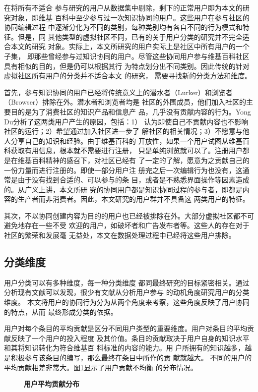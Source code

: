 在将所有不适合
参与研究的用户从数据集中剔除，剩下的正常用户即为本文的研究对象，即维基
百科中至少参与过一次知识协同的用户。这些用户在参与社区的协同编辑过程
中逐渐分化为不同的类别，每种类别均有各自不同的行为模式和特征。但是，同
其他类型的虚拟社区不同，已有的关于用户分类的研究并不完全适合本文的研究
对象。实际上，本文所研究的用户实际上是社区中所有用户的一个子集，
即那些曾经参与过知识协同的用户。尽管这些协同用户参与维基百科社区具有相似的目的，但是仍可以根据其行
为特点划分出不同类别。因此传统的针对虚拟社区所有用户的分类并不适合本文
的研究，
需要寻找新的分类方法和维度。

首先，参与知识协同的用户已经将传统意义上的潜水者（Lurker）和浏览者
（Browser）排除在外。潜水者和浏览者均是
社区的外围成员，他们加入社区的主要目的是为了消费社区的知识产品和信息产
品，几乎没有贡献内容的行为。Yong Du分析了这两类用户产生的原因，包括：1）
认为即使自己不贡献内容也不影响社区的运行；2）希望通过加入社区进一步了
解社区的相关情况；3）不愿意与他人分享自己的知识和经验\cite{4052703}。由于维基百科的
开放性，如果一个用户试图从维基百科获取有用信息，根本就不需要进行注册，
只是单纯浏览就可以了。注册用户都是在维基百科精神的感召下，对社区已经有
了一定的了解，愿意为之贡献自己的一份力量而进行注册的。即使一部分用户注
册完之后一次编辑行为也没有，这通常是由于没有找到合适的、可以参与的条
目，或者是不熟悉界面操作等因素造成的。从广义上讲，本文所研
究的协同用户都是知识协同过程的参与者，即都是内容的生产者而非消费者。因此，本文研究的用户群并不具备这
两类用户的特征。

其次，不以协同创建内容为目的的用户也已经被排除在外。大部分虚拟社区都不可避免地存在一些不受
欢迎的用户，如破坏者和广告发布者等。这些人的存在对于社区的繁荣和发展毫
无益处，本文在数据处理过程中已经将这些用户排除。



\subsection{分类维度}
\label{sec:dimension}
用户分类可以有多种维度，每一种分类维度
都同最终研究的目标紧密相关。通过分析现有文献可以发现，很少有文献从分析用户参与
的动机角度研究用户的分类维度。
本文将用户的协同行为分为从两个角度来考察，这些角度反映了用户协同的特点，从而
最终形成分类的依据。

用户对每个条目的平均贡献是区分不同用户类型的重要维度。用户对条目的平均贡献反映了一个用户的投入程度
及其价值。条目的贡献取决于用户自身的知识水平和其将知识转化为符合维基百
科标准的内容的能力。用
户所拥有的知识越多，越是积极参与该条目的编写，那么最终在条目中所作的贡
献就越大。
不同的用户的平均贡献相差非常大。图\ref{fig:con-detri}显示了用户贡献不均衡
的分布情况。
\begin{figure}[!htb]
   \centering
   
\caption{\small{\textbf{用户平均贡献分布}}}
 \label{fig:con-detri}
\end{figure}

